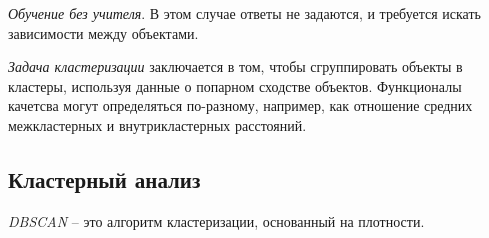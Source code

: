 \begin{definition}
  \emph{Обучение без учителя}. В этом случае ответы не задаются, и требуется искать зависимости между объектами.
\end{definition}

\begin{definition}
  \emph{Задача кластеризации} заключается в том, чтобы сгруппировать объекты в кластеры, используя данные о попарном сходстве объектов. Функционалы качетсва могут определяться по-разному, например, как отношение средних межкластерных и внутрикластерных расстояний.
\end{definition}

\subsection{Кластерный анализ}

\begin{definition}[DBSCAN]
  \emph{DBSCAN} -- это алгоритм кластеризации, основанный на плотности.
\end{definition}
